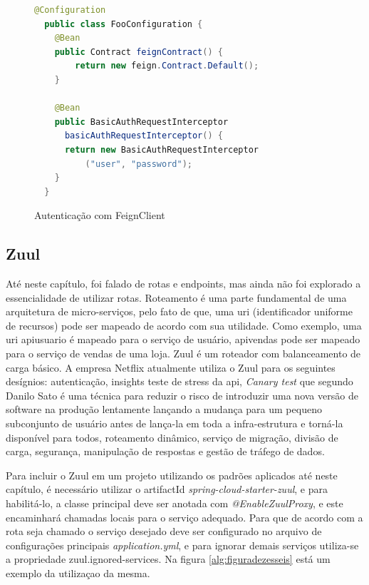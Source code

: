 \documentclass[journal]{IEEEtran}
\begin{document}
\begin{figure}[h]
\centering

\begin{lstlisting}[language=Java]
  @Configuration
  public class FooConfiguration {
    @Bean
    public Contract feignContract() {
        return new feign.Contract.Default();
    }

    @Bean
    public BasicAuthRequestInterceptor 
      basicAuthRequestInterceptor() {
      return new BasicAuthRequestInterceptor
          ("user", "password");
    }
  }
\end{lstlisting}

\caption{Autenticação com FeignClient}
\label{alg:figuraquinze}
\end{figure}

\subsection{Zuul}

Até neste capítulo, foi falado de rotas e endpoints, mas ainda não foi explorado a essencialidade de utilizar rotas. Roteamento é uma parte fundamental de uma arquitetura de micro-serviços, pelo fato de que, uma uri (identificador uniforme de recursos) pode ser mapeado de acordo com sua utilidade. Como exemplo, uma uri \/api\/usuario é mapeado para o serviço de usuário, \/api\/vendas pode ser mapeado para o serviço de vendas de uma loja. Zuul é um roteador com balanceamento de carga básico. A empresa Netflix atualmente utiliza o Zuul para os seguintes desígnios: autenticação, insights teste de stress da api, \emph{Canary test} que segundo Danilo Sato \cite{danilosato2017} é uma técnica para reduzir o risco de introduzir uma nova versão de software na produção lentamente lançando a mudança para um pequeno subconjunto de usuário antes de lança-la em toda a infra-estrutura e torná-la disponível para todos, roteamento dinâmico, serviço de migração, divisão de carga, segurança, manipulação de respostas e gestão de tráfego de dados.

Para incluir o Zuul em um projeto utilizando os padrões aplicados até neste capítulo, é necessário utilizar o artifactId \emph{spring-cloud-starter-zuul}, e para habilitá-lo, a classe principal deve ser anotada com \emph{@EnableZuulProxy}, e este encaminhará chamadas locais para o serviço adequado. Para que de acordo com a rota seja chamado o serviço desejado deve ser configurado no arquivo de configurações principais \emph{application.yml}, e para ignorar demais serviços utiliza-se a propriedade zuul.ignored-services. Na figura \ref{alg:figuradezesseis} está um exemplo da utilizaçao da mesma.
\end{document}
